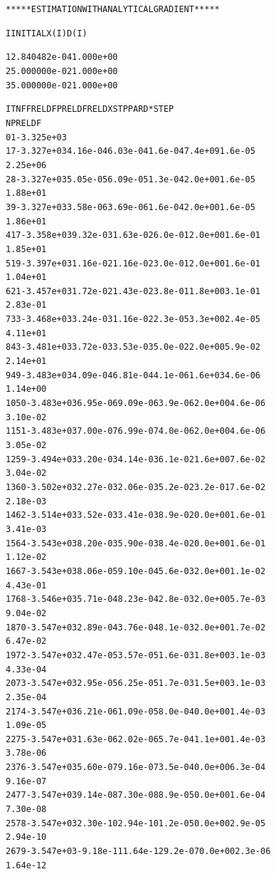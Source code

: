 \documentclass[letterpaper,10pt,english]{/Users/edwsurewin/anaconda/lib/python2.7/site-packages/sphinx/texinputs/sphinxhowto}
\newenvironment{InvisibleVerbatim}
        {\begin{mdframed}[leftmargin=0.1\linewidth,innerleftmargin=3pt,innerrightmargin=3pt, userdefinedwidth=1\linewidth, linewidth=0pt, linecolor=white, usetwoside=false]}
        {\end{mdframed}}
\begin{document}
                \begin{InvisibleVerbatim}
                \vspace{-0.5\baselineskip}
\begin{alltt}
 ***** ESTIMATION WITH ANALYTICAL GRADIENT *****


     I     INITIAL X(I)        D(I)

     1     2.840482e-04     1.000e+00
     2     5.000000e-02     1.000e+00
     3     5.000000e-02     1.000e+00

    IT   NF      F         RELDF    PRELDF    RELDX   STPPAR   D*STEP
NPRELDF
     0    1 -3.325e+03
     1    7 -3.327e+03  4.16e-04  6.03e-04  1.6e-04  7.4e+09  1.6e-05
2.25e+06
     2    8 -3.327e+03  5.05e-05  6.09e-05  1.3e-04  2.0e+00  1.6e-05
1.88e+01
     3    9 -3.327e+03  3.58e-06  3.69e-06  1.6e-04  2.0e+00  1.6e-05
1.86e+01
     4   17 -3.358e+03  9.32e-03  1.63e-02  6.0e-01  2.0e+00  1.6e-01
1.85e+01
     5   19 -3.397e+03  1.16e-02  1.16e-02  3.0e-01  2.0e+00  1.6e-01
1.04e+01
     6   21 -3.457e+03  1.72e-02  1.43e-02  3.8e-01  1.8e+00  3.1e-01
2.83e-01
     7   33 -3.468e+03  3.24e-03  1.16e-02  2.3e-05  3.3e+00  2.4e-05
4.11e+01
     8   43 -3.481e+03  3.72e-03  3.53e-03  5.0e-02  2.0e+00  5.9e-02
2.14e+01
     9   49 -3.483e+03  4.09e-04  6.81e-04  4.1e-06  1.6e+03  4.6e-06
1.14e+00
    10   50 -3.483e+03  6.95e-06  9.09e-06  3.9e-06  2.0e+00  4.6e-06
3.10e-02
    11   51 -3.483e+03  7.00e-07  6.99e-07  4.0e-06  2.0e+00  4.6e-06
3.05e-02
    12   59 -3.494e+03  3.20e-03  4.14e-03  6.1e-02  1.6e+00  7.6e-02
3.04e-02
    13   60 -3.502e+03  2.27e-03  2.06e-03  5.2e-02  3.2e-01  7.6e-02
2.18e-03
    14   62 -3.514e+03  3.52e-03  3.41e-03  8.9e-02  0.0e+00  1.6e-01
3.41e-03
    15   64 -3.543e+03  8.20e-03  5.90e-03  8.4e-02  0.0e+00  1.6e-01
1.12e-02
    16   67 -3.543e+03  8.06e-05  9.10e-04  5.6e-03  2.0e+00  1.1e-02
4.43e-01
    17   68 -3.546e+03  5.71e-04  8.23e-04  2.8e-03  2.0e+00  5.7e-03
9.04e-02
    18   70 -3.547e+03  2.89e-04  3.76e-04  8.1e-03  2.0e+00  1.7e-02
6.47e-02
    19   72 -3.547e+03  2.47e-05  3.57e-05  1.6e-03  1.8e+00  3.1e-03
4.33e-04
    20   73 -3.547e+03  2.95e-05  6.25e-05  1.7e-03  1.5e+00  3.1e-03
2.35e-04
    21   74 -3.547e+03  6.21e-06  1.09e-05  8.0e-04  0.0e+00  1.4e-03
1.09e-05
    22   75 -3.547e+03  1.63e-06  2.02e-06  5.7e-04  1.1e+00  1.4e-03
3.78e-06
    23   76 -3.547e+03  5.60e-07  9.16e-07  3.5e-04  0.0e+00  6.3e-04
9.16e-07
    24   77 -3.547e+03  9.14e-08  7.30e-08  8.9e-05  0.0e+00  1.6e-04
7.30e-08
    25   78 -3.547e+03  2.30e-10  2.94e-10  1.2e-05  0.0e+00  2.9e-05
2.94e-10
    26   79 -3.547e+03 -9.18e-11  1.64e-12  9.2e-07  0.0e+00  2.3e-06
1.64e-12


\end{alltt}
\end{InvisibleVerbatim}
\end{document}

